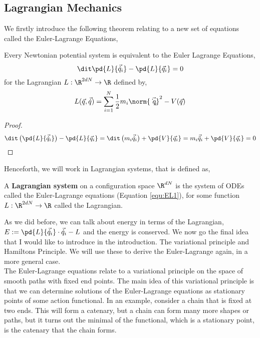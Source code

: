 \subsection{Lagrangian Mechanics}
We firstly introduce the following theorem relating to a new set of equations called the Euler-Lagrange Equations,
\begin{nthm}
  Every Newtonian potential system is equivalent to the Euler Lagrange Equations,
  \begin{equation}
    \dit \pd{L}{\vec{\dot q}_i} - \pd{L}{\vec q_i} = 0 \label{equ:EL1}
  \end{equation}
  for the Lagrangian $L : \R^{2dN} \to \R$ defined by,
  $$ L(\vec q, \vec{\dot q}) = \sum_{i=1}^N \frac{1}{2}m_i\norm{\vec{\dot q_i}}^2 - V(\vec q) $$
\end{nthm}
\begin{proof}
  $$ \dit \left( \pd{L}{\vec{\dot q}_i} \right) - \pd{L}{\vec q_i} = \dit\left( m_i\vec{\dot q}_i \right) + \pd{V}{\vec q_i} =  m_i\vec{\ddot q}_i + \pd{V}{\vec q_i} = 0$$
\end{proof}

\noindent
Henceforth, we will work in Lagrangian systems, that is defined as,
\begin{ndefi}
  A \textbf{Lagrangian system} on a configuration space $\R^{dN}$ is the system of ODEs called the Euler-Lagrange equations (Equation \ref{equ:EL1}), for some function $L : \R^{2dN} \to \R$ called the Lagrangian.
\end{ndefi}

\noindent
As we did before, we can talk about energy in terms of the Lagrangian, $E := \pd{L}{\vec{\dot q}_i} \cdot \vec{\dot q}_i - L$ and the energy is conserved. We now go the final idea that I would like to introduce in the introduction. The variational principle and Hamiltons Principle. We will use these to derive the Euler-Lagrange again, in a more general case. \\

\noindent
The Euler-Lagrange equations relate to a variational principle on the space of smooth paths with fixed end points. The main idea of this variational principle is that we can determine solutions of the Euler-Lagrange equations as stationary points of some action functional. In an example, consider a chain that is fixed at two ends. This will form a catenary, but a chain can form many more shapes or paths, but it turns out the minimal of the functional, which is a stationary point, is the catenary that the chain forms.\\

